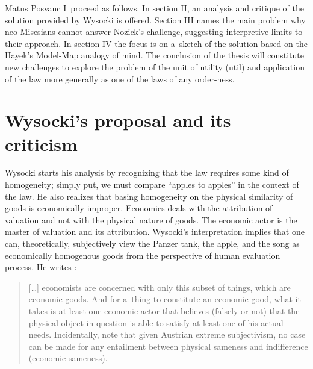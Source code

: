 \begin{artengenv}{Matus Posvanc}
I~proceed as follows. In section II, an analysis and critique of the solution provided by Wysocki 
\parencite*[][]{Wysocki2021problem} %
 is offered. Section III names the main problem why neo-Misesians cannot answer Nozick's challenge, suggesting interpretive limits to their approach. In section IV the focus is on a~sketch of the solution based on the Hayek's Model-Map analogy of mind. The conclusion of the thesis will constitute new challenges to explore the problem of the unit of utility (util) and application of the law more generally as one of the laws of any order-ness.



\section{Wysocki's \parencite*{Wysocki2021problem} proposal and its criticism}



Wysocki starts his analysis by recognizing that the law requires some kind of homogeneity; simply put, we must compare ``apples to apples'' in the context of the law. He also realizes that basing homogeneity on the physical similarity of goods is economically improper. Economics deals with the attribution of valuation and not with the physical nature of goods. The economic actor is the master of valuation and its attribution. Wysocki's interpretation implies that one can, theoretically, subjectively view the Panzer tank, the apple, and the song as economically homogenous goods from the perspective of human evaluation process. He writes 
\parencite[][p.14]{Wysocki2021problem}:%




\begin{quote}
[…] economists are concerned with only this subset of things, which are economic goods. And for a~thing to constitute an economic good, what it takes is at least one economic actor that believes (falsely or not) that the physical object in question is able to satisfy at least one of his actual needs. Incidentally, note that given Austrian extreme subjectivism, no case can be made for any entailment between physical sameness and indifference (economic sameness).
\end{quote}




\end{artengenv}
